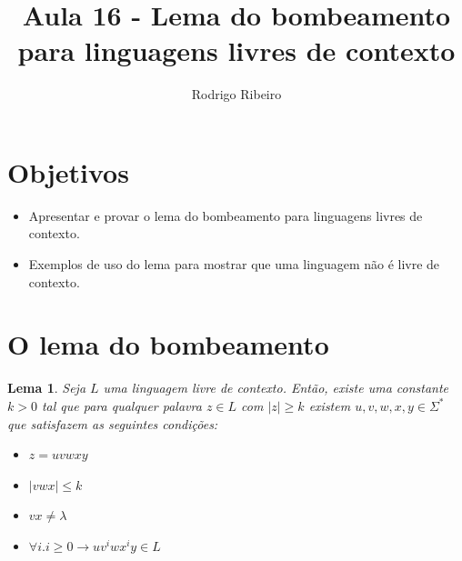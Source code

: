 \documentclass[a4paper]{article}
\newtheorem{Lemma}{Lema}
\theoremstyle{definition}
\begin{document}
  \title{Aula 16 - Lema do bombeamento para linguagens livres de contexto}
  \author{Rodrigo Ribeiro}

  \maketitle


  \pagestyle{fancy}


  \section*{Objetivos}

  \begin{itemize}
     \item Apresentar e provar o lema do bombeamento para linguagens livres de contexto.
     \item Exemplos de uso do lema para mostrar que uma linguagem não é livre de contexto.   
  \end{itemize}

  \section{O lema do bombeamento}

  \begin{Lemma}
    Seja $L$ uma linguagem livre de contexto. Então, existe uma constante $k >
    0$ tal que para qualquer  palavra $z \in L$ com $|z| \geq k$ existem
    $u,v,w,x,y \in \Sigma^*$ que satisfazem as seguintes condições:
    \begin{itemize}
      \item $z = uvwxy$
      \item $|vwx| \leq k$
      \item $vx \neq \lambda$
      \item $\forall i. i \geq 0 \to uv^iwx^iy \in L$
    \end{itemize}
  \end{Lemma}
\end{document}
